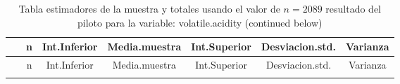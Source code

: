 \documentclass[
]{article}
\begin{document}
\begin{longtable}[]{@{}ccccccc@{}}
\caption{Tabla estimadores de la muestra y totales usando el valor de
\(n = 2089\) resultado del piloto para la variable: volatile.acidity
(continued below)}\tabularnewline
\toprule
\begin{minipage}[b]{0.20\columnwidth}\centering
~\strut
\end{minipage} & \begin{minipage}[b]{0.05\columnwidth}\centering
n\strut
\end{minipage} & \begin{minipage}[b]{0.11\columnwidth}\centering
Int.Inferior\strut
\end{minipage} & \begin{minipage}[b]{0.12\columnwidth}\centering
Media.muestra\strut
\end{minipage} & \begin{minipage}[b]{0.11\columnwidth}\centering
Int.Superior\strut
\end{minipage} & \begin{minipage}[b]{0.13\columnwidth}\centering
Desviacion.std.\strut
\end{minipage} & \begin{minipage}[b]{0.09\columnwidth}\centering
Varianza\strut
\end{minipage}\tabularnewline
\midrule
\endfirsthead
\toprule
\begin{minipage}[b]{0.20\columnwidth}\centering
~\strut
\end{minipage} & \begin{minipage}[b]{0.05\columnwidth}\centering
n\strut
\end{minipage} & \begin{minipage}[b]{0.11\columnwidth}\centering
Int.Inferior\strut
\end{minipage} & \begin{minipage}[b]{0.12\columnwidth}\centering
Media.muestra\strut
\end{minipage} & \begin{minipage}[b]{0.11\columnwidth}\centering
Int.Superior\strut
\end{minipage} & \begin{minipage}[b]{0.13\columnwidth}\centering
Desviacion.std.\strut
\end{minipage} & \begin{minipage}[b]{0.09\columnwidth}\centering
Varianza\strut
\end{minipage}\tabularnewline
\midrule
\endhead
\begin{minipage}[t]{0.20\columnwidth}\centering

\end{minipage}
\end{longtable}
\end{document}
